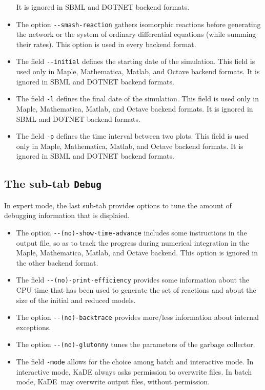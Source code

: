 \documentclass[11pt]{book}
\def\KaDE{\textsf{KaDE}}
\begin{document}
\begin{itemize}
  It is ignored in SBML and DOTNET backend formats.
  \item The option \texttt{-{}-smash-reaction} gathers isomorphic reactions before generating the network or the system of ordinary differential equations (while summing their rates). This option is used in every backend format.
  \item The field \texttt{-{}-initial} defines the starting date of the simulation. This field is used only in Maple, Mathematica, Matlab, and Octave backend formats.
  It is ignored in SBML and DOTNET backend formats.
  \item The field \texttt{-l} defines the final date of the simulation. This field is used only in Maple, Mathematica, Matlab, and Octave backend formats.
  It is ignored in SBML and DOTNET backend formats.
  \item The field \texttt{-p} defines the time interval between two plots. This field is used only in Maple, Mathematica, Matlab, and Octave backend formats.
  It is ignored in SBML and DOTNET backend formats.
\end{itemize}

\subsection{The sub-tab \texttt{Debug}}

In expert mode, the last sub-tab provides options to tune the amount of debugging information that is displaied.

\begin{itemize}
\item The option \texttt{-{}-(no)-show-time-advance} includes some
instructions in the output file, so as to track the progress during numerical integration in the Maple, Mathematica, Matlab, and Octave backend.
This option is ignored in the other backend format.

\item The field \texttt{-{}-(no)-print-efficiency} provides some information about the CPU time that has been used to generate the set of reactions and about the size of the initial and reduced models.

\item The option \texttt{-{}-(no)-backtrace} provides more/less information about internal exceptions.
\item The option \texttt{-{}-(no)-glutonny} tunes the parameters of the garbage collector.
\item The field \texttt{-mode} allows for the choice among batch and interactive mode. In interactive mode, {\KaDE} always asks  permission to  overwrite files. In batch mode, {\KaDE} may overwrite output files, without permission.
\end{itemize}
\end{document}
